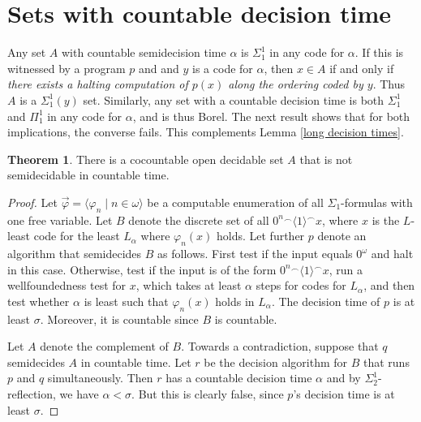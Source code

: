 \documentclass[a4paper,11pt]{amsart}
\theoremstyle{definition}
\newtheorem{theorem}[fact]{Theorem}
\newtheorem*{problem A}{Problem 1}
\newtheorem*{problem B}{Problem 2}
\theoremstyle{remark}
\begin{document}
\section{Sets with countable decision time} 

Any set $A$ with countable semidecision time $\alpha$ is $\Sigma^1_1$ in any code for $\alpha$. 
If this is witnessed by a program $p$ and and $y$ is a code for $\alpha$, then 
$x\in A$ if and only if {\em there exists a halting computation of $p(x)$ 
along the ordering coded by $y$}.  Thus $A$ is  a $\Sigma^{1}_{1}(y)$ set. 
Similarly, any set with a countable decision time is both $\Sigma^1_1$ and $\Pi^1_1$ in any code for $\alpha$, and is thus Borel. 
The next result shows that for both implications, the converse fails. 
This complements Lemma \ref{long decision times}. 

\begin{theorem} 
\label{Borel set with uncountable decision time} 
There is a cocountable open decidable set $A$ that is not semidecidable in countable time. 
\end{theorem} 
\begin{proof} 
Let $\vec{\varphi}=\langle \varphi_n\mid n\in\omega\rangle$ be a computable enumeration of all $\Sigma_1$-formulas with one free variable. 
Let $B$ denote the discrete set of all $0^n{}^\smallfrown \langle1\rangle^\smallfrown x$, where $x$ is the $L$-least code for the least $L_\alpha$ where $\varphi_n(x)$ holds. 
Let further $p$ denote an algorithm that semidecides $B$ as follows.
First test if the input equals $0^\omega$ and halt in this case. 
Otherwise, test if the input is of the form $0^n{}^\smallfrown \langle1\rangle^\smallfrown x$, run a wellfoundedness test for $x$, which takes at least $\alpha$ steps for codes for $L_\alpha$, and then test whether $\alpha$ is least such that $\varphi_n(x)$ holds in $L_\alpha$. 
The decision time of $p$ is at least $\sigma$. 
Moreover, it is countable since $B$ is countable. 

Let $A$ denote the complement of $B$. 
Towards a contradiction, suppose that $q$ semidecides $A$ in countable time. 
Let $r$ be the decision algorithm for $B$ that runs $p$ and $q$ simultaneously. 
Then $r$ has a countable decision time $\alpha$ and by $\Sigma^1_2$-reflection, we have $\alpha<\sigma$. 
But this is clearly false, since $p$'s decision time is at least $\sigma$. 
\end{proof} 
\end{document}
